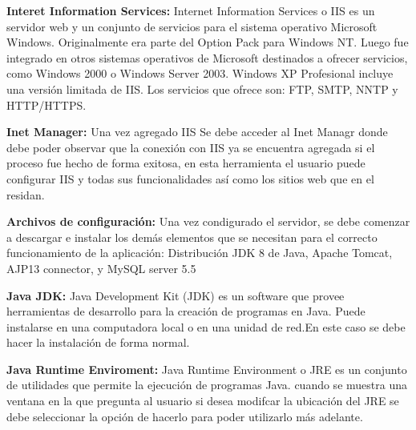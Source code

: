 \textbf{Interet Information Services:} Internet Information Services o IIS es un servidor web y un conjunto de servicios para el sistema operativo Microsoft Windows. Originalmente era parte del Option Pack para Windows NT. Luego fue integrado en otros sistemas operativos de Microsoft destinados a ofrecer servicios, como Windows 2000 o Windows Server 2003. Windows XP Profesional incluye una versión limitada de IIS. Los servicios que ofrece son: FTP, SMTP, NNTP y HTTP/HTTPS. 


\newpage

\textbf{Inet Manager:} Una vez agregado IIS Se debe acceder al Inet Managr donde debe poder observar que la conexión con IIS ya se encuentra agregada si el proceso fue hecho de forma exitosa, en esta herramienta el usuario puede configurar IIS y todas sus funcionalidades así como los sitios web que en el residan.


\newpage

\textbf{Archivos de configuración:} Una vez condigurado el servidor, se debe comenzar a descargar e instalar los demás elementos que se necesitan para el correcto funcionamiento de la aplicación: Distribución JDK 8 de Java, Apache Tomcat, AJP13 connector, y MySQL server 5.5 


\newpage

\textbf{Java JDK:} Java Development Kit (JDK) es un software que provee herramientas de desarrollo para la creación de programas en Java. Puede instalarse en una computadora local o en una unidad de red.En este caso se debe hacer la instalación de forma normal.


\newpage

\textbf{Java Runtime Enviroment:} Java Runtime Environment o JRE es un conjunto de utilidades que permite la ejecución de programas Java. cuando se muestra una ventana en la que pregunta al usuario si desea modifcar la ubicación del JRE se debe seleccionar la opción de hacerlo para poder utilizarlo más adelante.


\newpage


